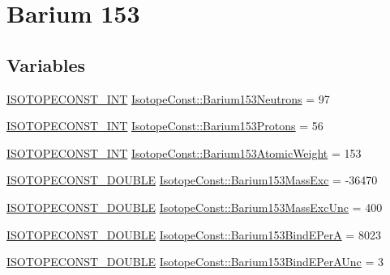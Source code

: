 \hypertarget{group___isotope_const-_barium-_ba153}{}\section{Barium 153}
\label{group___isotope_const-_barium-_ba153}
\subsection*{Variables}
\begin{DoxyCompactItemize}
\item 
\mbox{\hyperlink{group___isotope_const-_macros_ga5f18360b3e99483a35c32d789e62621c}{I\+S\+O\+T\+O\+P\+E\+C\+O\+N\+S\+T\+\_\+\+I\+NT}} \mbox{\hyperlink{group___isotope_const-_barium-_ba153_ga73f91d0dca46907aae800587db670baf}{Isotope\+Const\+::\+Barium153\+Neutrons}} = 97
\item 
\mbox{\hyperlink{group___isotope_const-_macros_ga5f18360b3e99483a35c32d789e62621c}{I\+S\+O\+T\+O\+P\+E\+C\+O\+N\+S\+T\+\_\+\+I\+NT}} \mbox{\hyperlink{group___isotope_const-_barium-_ba153_gac85cbd135b616425745bfa8bd350f072}{Isotope\+Const\+::\+Barium153\+Protons}} = 56
\item 
\mbox{\hyperlink{group___isotope_const-_macros_ga5f18360b3e99483a35c32d789e62621c}{I\+S\+O\+T\+O\+P\+E\+C\+O\+N\+S\+T\+\_\+\+I\+NT}} \mbox{\hyperlink{group___isotope_const-_barium-_ba153_ga210d3f954effda34d97bc826cd962d81}{Isotope\+Const\+::\+Barium153\+Atomic\+Weight}} = 153
\item 
\mbox{\hyperlink{group___isotope_const-_macros_ga8f45a7272ce02c0b4c65c44636ed719a}{I\+S\+O\+T\+O\+P\+E\+C\+O\+N\+S\+T\+\_\+\+D\+O\+U\+B\+LE}} \mbox{\hyperlink{group___isotope_const-_barium-_ba153_ga7240e7e78f7fd7921cbce089c0e3e967}{Isotope\+Const\+::\+Barium153\+Mass\+Exc}} = -\/36470
\item 
\mbox{\hyperlink{group___isotope_const-_macros_ga8f45a7272ce02c0b4c65c44636ed719a}{I\+S\+O\+T\+O\+P\+E\+C\+O\+N\+S\+T\+\_\+\+D\+O\+U\+B\+LE}} \mbox{\hyperlink{group___isotope_const-_barium-_ba153_gac7cf9ffce67f61c76d06682da409f001}{Isotope\+Const\+::\+Barium153\+Mass\+Exc\+Unc}} = 400
\item 
\mbox{\hyperlink{group___isotope_const-_macros_ga8f45a7272ce02c0b4c65c44636ed719a}{I\+S\+O\+T\+O\+P\+E\+C\+O\+N\+S\+T\+\_\+\+D\+O\+U\+B\+LE}} \mbox{\hyperlink{group___isotope_const-_barium-_ba153_gabd5932ad1d304b998b72970521be0ea1}{Isotope\+Const\+::\+Barium153\+Bind\+E\+PerA}} = 8023
\item 
\mbox{\hyperlink{group___isotope_const-_macros_ga8f45a7272ce02c0b4c65c44636ed719a}{I\+S\+O\+T\+O\+P\+E\+C\+O\+N\+S\+T\+\_\+\+D\+O\+U\+B\+LE}} \mbox{\hyperlink{group___isotope_const-_barium-_ba153_ga977e43040b5ab1c8dbdb792a48f0db77}{Isotope\+Const\+::\+Barium153\+Bind\+E\+Per\+A\+Unc}} = 3

\end{DoxyCompactItemize}
